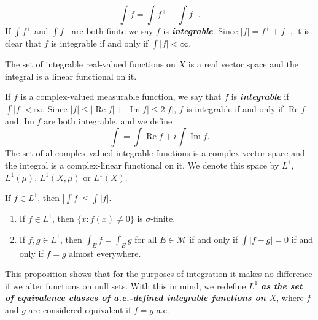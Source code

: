 \documentclass{article}
\theoremstyle{definition}
\numberwithin{equation}{section}
\begin{document}
	\[\int f=\int f^+-\int f^-.\]
	If $\int f^+$ and $\int f^-$ are both finite we say $f$ is \textbf{\textit{integrable}}. Since $|f|=f^++f^-$, it is clear that $f$ is integrable if and only if $\int|f|<\infty$.
	\begin{prop}
		The set of integrable real-valued functions on $X$ is a real vector space and the integral is a linear functional on it.
	\end{prop}
	If $f$ is a complex-valued measurable function, we say that $f$ is \textbf{\textit{integrable}} if $\int|f|<\infty$. Since $|f|\leq|\operatorname{Re}f|+|\operatorname{Im}f|\leq2|f|$, $f$ is integrable if and only if $\operatorname{Re}f$ and $\operatorname{Im}f$ are both integrable, and we define
	\[\int=\int\operatorname{Re}f+i\int\operatorname{Im}f.\]
	The set of al complex-valued integrable functions is a complex vector space and the integral is a complex-linear functional on it. We denote this space by $L^1$, $L^1(\mu)$, $L^1(X,\mu)$ or $L^1(X)$.
	\begin{prop}
		If $f\in L^1$, then $|\int f|\leq \int|f|$.
	\end{prop}
	\begin{prop}\leavevmode
		\begin{enumerate}
			\item If $f\in L^1$, then $\{x:f(x)\neq0\}$ is $\sigma$-finite.
			\item If $f,g\in L^1$, then $\int_E f=\int_E g$ for all $E\in\mathcal{M}$ if and only if $\int|f-g|=0$ if and only if $f=g$ almost everywhere.
		\end{enumerate}
	\end{prop}
	This proposition shows that for the purposes of integration it makes no difference if we alter functions on null sets. With this in mind, we redefine $L^1$ \textbf{\textit{as the set of equivalence classes of a.e.-defined integrable functions on $X$}}, where $f$ and $g$ are considered equivalent if $f=g$ a.e.
	
\end{document}
